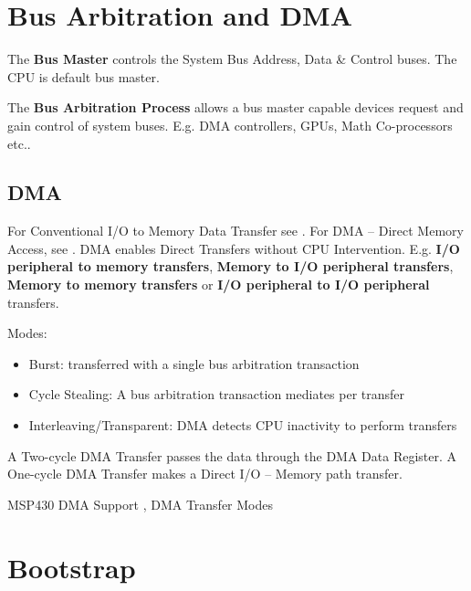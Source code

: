 \section{Bus Arbitration and DMA }
The \textbf{Bus Master} controls the System Bus Address, Data \& Control buses. The CPU is default bus master.

The \textbf{Bus Arbitration Process} allows a bus master capable devices request and gain control of system buses.
E.g. DMA controllers, GPUs, Math Co-processors etc..

\subsection{DMA }
For Conventional I/O to Memory Data Transfer see .
For DMA – Direct Memory Access, see .
DMA enables Direct Transfers without CPU Intervention.
E.g. \textbf{I/O peripheral to memory transfers}, \textbf{Memory to I/O peripheral transfers}, \textbf{Memory to memory transfers} or \textbf{I/O peripheral to I/O peripheral} transfers.

Modes:
\begin{itemize}
	\itemsep-.5em
	\item Burst: transferred with a single bus arbitration transaction
	\item Cycle Stealing: A bus arbitration transaction mediates per transfer
	\item Interleaving/Transparent: DMA detects CPU inactivity to perform transfers
\end{itemize}

 A Two-cycle DMA Transfer passes the data through the DMA Data Register.
 A One-cycle DMA Transfer makes a Direct I/O – Memory path  transfer.

MSP430 DMA Support , DMA Transfer Modes 

\section{Bootstrap }